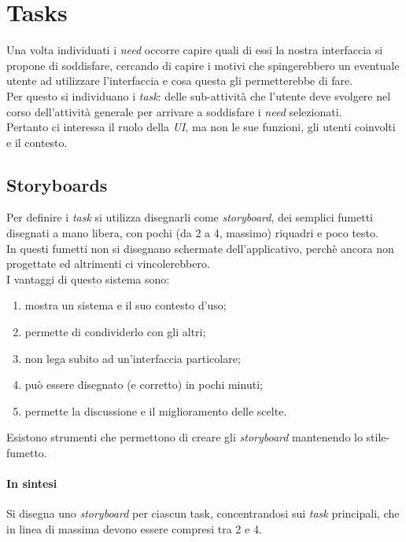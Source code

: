 \section{Tasks}
Una volta individuati i \textit{need} occorre capire quali di essi la nostra interfaccia si propone di soddisfare, cercando di capire i motivi che spingerebbero un eventuale utente ad utilizzare l'interfaccia e cosa questa gli permetterebbe di fare. \\
Per questo si individuano i \textit{task}: delle sub-attivit\`a che l'utente deve svolgere nel corso dell'attivit\`a generale per arrivare a soddisfare i \textit{need} selezionati. \\
Pertanto ci interessa il ruolo della \textit{UI}, ma non le sue funzioni, gli utenti coinvolti e il contesto.

\subsection{Storyboards}
Per definire i \textit{task} si utilizza disegnarli come \textit{storyboard}, dei semplici fumetti disegnati a mano libera, con pochi (da 2 a 4, massimo) riquadri e poco testo. \\
In questi fumetti non si disegnano schermate dell'applicativo, perch\`e ancora non progettate ed altrimenti ci vincolerebbero. \\
I vantaggi di questo sistema sono:
\begin{enumerate}
	\item mostra un sistema e il suo contesto d'uso;
	\item permette di condividerlo con gli altri;
	\item non lega subito ad un'interfaccia particolare;
	\item pu\`o essere disegnato (e corretto) in pochi minuti;
	\item permette la discussione e il miglioramento delle scelte.
\end{enumerate}
Esistono strumenti che permettono di creare gli \textit{storyboard} mantenendo lo stile-fumetto.
\paragraph{In sintesi}
Si disegna uno \textit{storyboard} per ciascun task, concentrandosi sui \textit{task} principali, che in linea di massima devono essere compresi tra 2 e 4.